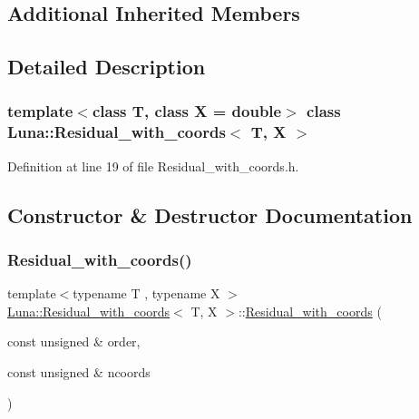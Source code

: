 \subsection*{Additional Inherited Members}


\subsection{Detailed Description}
\subsubsection*{template$<$class T, class X = double$>$\newline
class Luna\+::\+Residual\+\_\+with\+\_\+coords$<$ T, X $>$}



Definition at line 19 of file Residual\+\_\+with\+\_\+coords.\+h.



\subsection{Constructor \& Destructor Documentation}
\mbox{\label{classLuna_1_1Residual__with__coords_a61285d7e42d5ec57ba479e725cfd0340}} 
\subsubsection{\texorpdfstring{Residual\+\_\+with\+\_\+coords()}{Residual\_with\_coords()}\hspace{0.1cm}{\footnotesize\ttfamily [1/2]}}
{\footnotesize\ttfamily template$<$typename T , typename X $>$ \\
\hyperlink{classLuna_1_1Residual__with__coords}{Luna\+::\+Residual\+\_\+with\+\_\+coords}$<$ T, X $>$\+::\hyperlink{classLuna_1_1Residual__with__coords}{Residual\+\_\+with\+\_\+coords} (\begin{DoxyParamCaption}\item[{const unsigned \&}]{order,  }\item[{const unsigned \&}]{ncoords }\end{DoxyParamCaption})}




